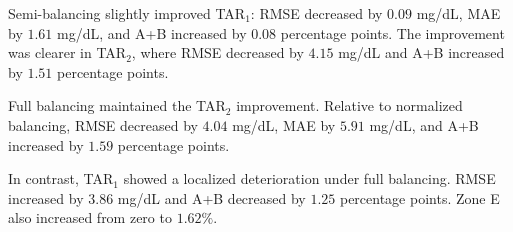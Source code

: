 \begin{table}[htbp]
    \centering
    \caption{Aggregate REPLACE-BG performance in the hyperglycemic
    ranges, averaged across balancing methods.}
    \label{tab:replacebg_hyperglycemia}
\end{table}

Semi-balancing slightly improved TAR$_1$: RMSE decreased by \(0.09\) mg/dL, MAE by \(1.61\) mg/dL, and A+B increased by \(0.08\) percentage points. The improvement was clearer in TAR$_2$, where RMSE decreased by \(4.15\) mg/dL and A+B increased by \(1.51\) percentage points.

Full balancing maintained the TAR$_2$ improvement. Relative to normalized balancing, RMSE decreased by \(4.04\) mg/dL, MAE by \(5.91\) mg/dL, and A+B increased by \(1.59\) percentage points.

In contrast, TAR$_1$ showed a localized deterioration under full balancing. RMSE increased by \(3.86\) mg/dL and A+B decreased by \(1.25\) percentage points. Zone E also increased from zero to \(1.62\%\).

